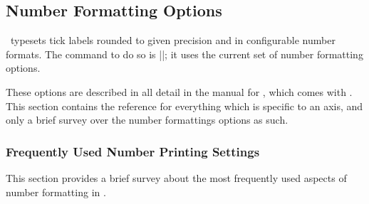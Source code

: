 
\subsection{Number Formatting Options}
\label{sec:number:printing}%
\PGFPlots\ typesets tick labels rounded to given precision and in configurable number formats. The command to do so is |\pgfmathprintnumber|; it uses the current set of number formatting options.

These options are described in all detail in the manual for \PGFPlotstable, which comes with \PGFPlots. This section contains the reference for everything which is specific to an axis, and only a brief survey over the number formattings options as such.

\subsubsection{Frequently Used Number Printing Settings}
\label{sec:number:faq}
This section provides a brief survey about the most frequently used aspects of number formatting in \PGFPlots. 
